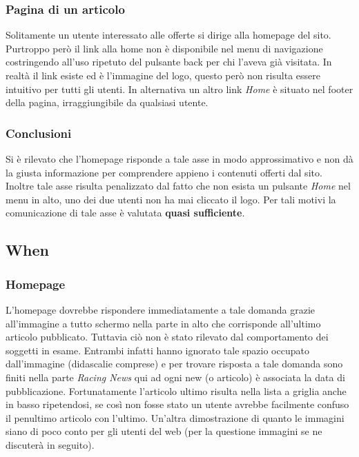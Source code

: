 		\subsubsection{Pagina di un articolo}
			Solitamente un utente interessato alle offerte si dirige alla homepage del sito. Purtroppo però il link alla home non è disponibile nel menu di navigazione costringendo all'uso ripetuto del pulsante back per chi l'aveva già visitata. In realtà il link esiste ed è l'immagine del logo, questo però non risulta essere intuitivo per tutti gli utenti. In alternativa un altro link \textit{Home} è situato nel footer della pagina, irraggiungibile da qualsiasi utente.
			
		\subsubsection{Conclusioni}
			Si è rilevato che l'homepage risponde a tale asse in modo approssimativo e non dà la giusta informazione per comprendere appieno i contenuti offerti dal sito. Inoltre tale asse risulta penalizzato dal fatto che non esista un pulsante \textit{Home} nel menu in alto, uno dei due utenti non ha mai cliccato il logo. Per tali motivi la comunicazione di tale asse è valutata \textbf{quasi sufficiente}.
		
	
	\subsection{When}
	
		\subsubsection{Homepage}
			L'homepage dovrebbe rispondere immediatamente a tale domanda grazie all'immagine a tutto schermo nella parte in alto che corrisponde all'ultimo articolo pubblicato. Tuttavia ciò non è stato rilevato dal comportamento dei soggetti in esame. Entrambi infatti hanno ignorato tale spazio occupato dall'immagine (didascalie comprese) e per trovare risposta a tale domanda sono finiti nella parte \textit{Racing News} qui ad ogni new (o articolo) è associata la data di pubblicazione. Fortunatamente l'articolo ultimo risulta nella lista a griglia anche in basso ripetendosi, se così non fosse stato un utente avrebbe facilmente confuso il penultimo articolo con l'ultimo. Un'altra dimostrazione di quanto le immagini siano di poco conto per gli utenti del web (per la questione immagini se ne discuterà in seguito).
		
